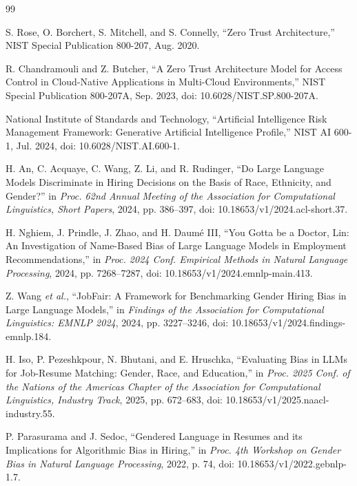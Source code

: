 \documentclass[conference]{IEEEtran}
\begin{document}
\begin{thebibliography}{99}

S. Rose, O. Borchert, S. Mitchell, and S. Connelly,
``Zero Trust Architecture,''
NIST Special Publication 800-207, Aug. 2020.

R. Chandramouli and Z. Butcher,
``A Zero Trust Architecture Model for Access Control in Cloud-Native Applications in Multi-Cloud Environments,''
NIST Special Publication 800-207A, Sep. 2023, doi: 10.6028/NIST.SP.800-207A.

National Institute of Standards and Technology,
``Artificial Intelligence Risk Management Framework: Generative Artificial Intelligence Profile,''
NIST AI 600-1, Jul. 2024, doi: 10.6028/NIST.AI.600-1.

H. An, C. Acquaye, C. Wang, Z. Li, and R. Rudinger,
``Do Large Language Models Discriminate in Hiring Decisions on the Basis of Race, Ethnicity, and Gender?''
in \emph{Proc. 62nd Annual Meeting of the Association for Computational Linguistics, Short Papers}, 2024, pp. 386--397, doi: 10.18653/v1/2024.acl-short.37.

H. Nghiem, J. Prindle, J. Zhao, and H. Daum\'{e} III,
``You Gotta be a Doctor, Lin: An Investigation of Name-Based Bias of Large Language Models in Employment Recommendations,''
in \emph{Proc. 2024 Conf. Empirical Methods in Natural Language Processing}, 2024, pp. 7268--7287, doi: 10.18653/v1/2024.emnlp-main.413.

Z. Wang \emph{et al.},
``JobFair: A Framework for Benchmarking Gender Hiring Bias in Large Language Models,''
in \emph{Findings of the Association for Computational Linguistics: EMNLP 2024}, 2024, pp. 3227--3246, doi: 10.18653/v1/2024.findings-emnlp.184.

H. Iso, P. Pezeshkpour, N. Bhutani, and E. Hruschka,
``Evaluating Bias in LLMs for Job-Resume Matching: Gender, Race, and Education,''
in \emph{Proc. 2025 Conf. of the Nations of the Americas Chapter of the Association for Computational Linguistics, Industry Track}, 2025, pp. 672--683, doi: 10.18653/v1/2025.naacl-industry.55.

P. Parasurama and J. Sedoc,
``Gendered Language in Resumes and its Implications for Algorithmic Bias in Hiring,''
in \emph{Proc. 4th Workshop on Gender Bias in Natural Language Processing}, 2022, p. 74, doi: 10.18653/v1/2022.gebnlp-1.7.


\end{thebibliography}
\end{document}
